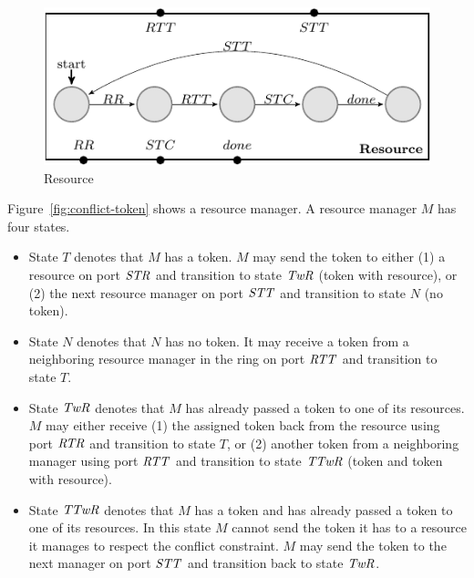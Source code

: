 \begin{figure}[H]
\begin{center}
\includegraphics[scale=1.2]{compiledfigures/resource-crop.pdf}
\caption{Resource}
\label{fig:resource}
\end{center}
\end{figure}

Figure~\ref{fig:conflict-token} shows a resource manager.
A resource manager $M$ has four states. 
\begin{itemize}
  \item State $T$ denotes that $M$ has a token. $M$ may send the token to either 
    (1) a resource on port $\mathit{STR}$ and transition to state $\mathit{TwR}$ (token with resource), or 
    (2) the next resource manager on port $\mathit{STT}$ and transition to state $N$ (no token).
  \item State $N$ denotes that $N$ has no token. 
    It may receive a token from a neighboring resource manager in the ring on port $\mathit{RTT}$ 
    and transition to state $T$. 
  \item State $\mathit{TwR}$ denotes that $M$ has already passed a token to one of its resources. 
    $M$ may either receive (1) the assigned token back from the resource using port $\mathit{RTR}$ and transition to state $T$, 
    or (2) another token from a neighboring manager using port $\mathit{RTT}$ and transition to state $\mathit{TTwR}$ (token and token with resource).
  \item State $\mathit{TTwR}$ denotes that $M$ has a token and has already passed a token to one of its resources. 
    In this state $M$ cannot send the token it has to a resource it manages to respect the conflict constraint. 
    $M$ may send the token to the next manager on port $\mathit{STT}$ and transition back to state $\mathit{TwR}$. 
\end{itemize}


